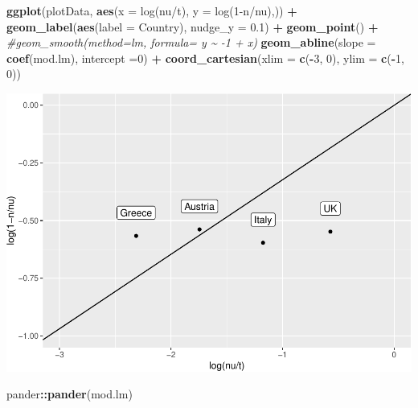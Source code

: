 \documentclass[
]{article}
\newenvironment{Shaded}{\begin{snugshade}}{\end{snugshade}}
\newcommand{\CommentTok}[1]{\textcolor[rgb]{0.56,0.35,0.01}{\textit{#1}}}
\newcommand{\DataTypeTok}[1]{\textcolor[rgb]{0.13,0.29,0.53}{#1}}
\newcommand{\DecValTok}[1]{\textcolor[rgb]{0.00,0.00,0.81}{#1}}
\newcommand{\FloatTok}[1]{\textcolor[rgb]{0.00,0.00,0.81}{#1}}
\newcommand{\KeywordTok}[1]{\textcolor[rgb]{0.13,0.29,0.53}{\textbf{#1}}}
\newcommand{\NormalTok}[1]{#1}
\newcommand{\OperatorTok}[1]{\textcolor[rgb]{0.81,0.36,0.00}{\textbf{#1}}}
\newcommand{\StringTok}[1]{\textcolor[rgb]{0.31,0.60,0.02}{#1}}
\begin{document}
\begin{Shaded}
\begin{Highlighting}[]
\KeywordTok{ggplot}\NormalTok{(plotData, }\KeywordTok{aes}\NormalTok{(}\DataTypeTok{x =} \StringTok{\textasciigrave{}}\DataTypeTok{log(nu/t)}\StringTok{\textasciigrave{}}\NormalTok{, }\DataTypeTok{y =} \StringTok{\textasciigrave{}}\DataTypeTok{log(1{-}n/nu)}\StringTok{\textasciigrave{}}\NormalTok{,)) }\OperatorTok{+}
\StringTok{  }\KeywordTok{geom\_label}\NormalTok{(}\KeywordTok{aes}\NormalTok{(}\DataTypeTok{label =}\NormalTok{ Country), }\DataTypeTok{nudge\_y =} \FloatTok{0.1}\NormalTok{) }\OperatorTok{+}
\StringTok{  }\KeywordTok{geom\_point}\NormalTok{() }\OperatorTok{+}
\StringTok{  }\CommentTok{\#geom\_smooth(method=\textquotesingle{}lm\textquotesingle{}, formula= y \textasciitilde{}  {-}1 + x)}
\StringTok{  }\KeywordTok{geom\_abline}\NormalTok{(}\DataTypeTok{slope =} \KeywordTok{coef}\NormalTok{(mod.lm), }\DataTypeTok{intercept =}\DecValTok{0}\NormalTok{) }\OperatorTok{+}
\StringTok{  }\KeywordTok{coord\_cartesian}\NormalTok{(}\DataTypeTok{xlim =} \KeywordTok{c}\NormalTok{(}\OperatorTok{{-}}\DecValTok{3}\NormalTok{, }\DecValTok{0}\NormalTok{), }\DataTypeTok{ylim =} \KeywordTok{c}\NormalTok{(}\OperatorTok{{-}}\DecValTok{1}\NormalTok{, }\DecValTok{0}\NormalTok{))}
\end{Highlighting}
\end{Shaded}

\includegraphics{pareto_model_of_testing_files/figure-latex/unnamed-chunk-2-1.pdf}

\begin{Shaded}
\begin{Highlighting}[]
\NormalTok{pander}\OperatorTok{::}\KeywordTok{pander}\NormalTok{(mod.lm)}
\end{Highlighting}
\end{Shaded}
\end{document}
